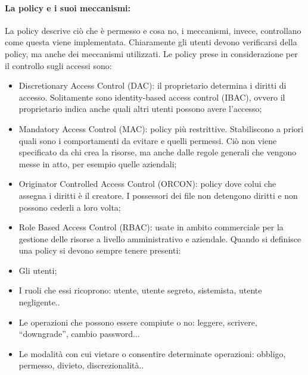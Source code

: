 \paragraph{La policy e i suoi meccanismi: }
La policy descrive ciò che è permesso e cosa no, i meccanismi,
invece, controllano come questa viene implementata. Chiaramente gli utenti devono verificarsi
della policy, ma anche dei meccanismi utilizzati.
Le policy prese in considerazione per il controllo sugli accessi sono:
\begin{itemize}
    \item Discretionary Access Control (DAC): il proprietario determina i diritti di accesso.
          Solitamente sono identity-based access control (IBAC), ovvero il proprietario indica anche
          quali altri utenti possono avere l’accesso;
    \item Mandatory Access Control (MAC): policy più restrittive. Stabiliscono a priori quali sono i
          comportamenti da evitare e quelli permessi. Ciò non viene specificato da chi crea la risorse,
          ma anche dalle regole generali che vengono messe in atto, per esempio quelle aziendali;
    \item Originator Controlled Access Control (ORCON): policy dove colui che assegna i diritti è il
          creatore. I possessori dei file non detengono diritti e non possono cederli a loro volta;
    \item Role Based Access Control (RBAC): usate in ambito commerciale per la gestione delle
          risorse a livello amministrativo e aziendale.
          Quando si definisce una policy si devono sempre tenere presenti:
    \item Gli utenti;
    \item I ruoli che essi ricoprono: utente, utente segreto, sistemista, utente negligente..
    \item Le operazioni che possono essere compiute o no: leggere, scrivere, “downgrade”, cambio
          password...
    \item Le modalità con cui vietare o consentire determinate operazioni: obbligo, permesso, divieto,
          discrezionalità..
\end{itemize}

